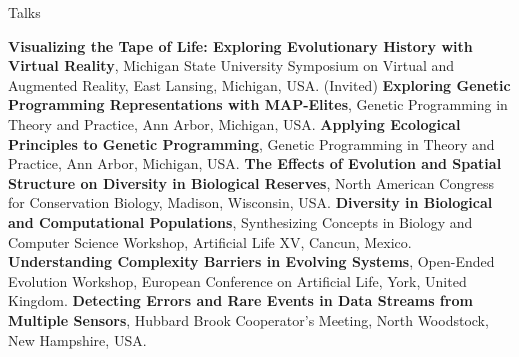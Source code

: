 \begin{rubric}{Talks}

\entry*[2018] \textbf{Visualizing the Tape of Life: Exploring Evolutionary History with Virtual Reality}, Michigan State University Symposium on Virtual and Augmented Reality, East Lansing, Michigan, USA. (Invited)
%
\entry*[2018] \textbf{Exploring Genetic Programming Representations with MAP-Elites}, Genetic Programming in Theory and Practice, Ann Arbor, Michigan, USA.
%
\entry*[2017] \textbf{Applying Ecological Principles to Genetic Programming}, Genetic Programming in Theory and Practice, Ann Arbor, Michigan, USA.
%
\entry*[2016] \textbf{The Effects of Evolution and Spatial Structure on Diversity in Biological Reserves}, North American Congress for Conservation Biology, Madison, Wisconsin, USA. 
%
\entry*[2016] \textbf{Diversity in Biological and Computational Populations}, Synthesizing Concepts in Biology and Computer Science Workshop, Artificial Life XV, Cancun, Mexico. 
%
\entry*[2015] \textbf{Understanding Complexity Barriers in Evolving Systems}, Open-Ended Evolution Workshop, European Conference on Artificial Life, York, United Kingdom. 
%
\entry*[2013] \textbf{Detecting Errors and Rare Events in Data Streams from Multiple Sensors}, Hubbard Brook Cooperator's Meeting, North Woodstock, New Hampshire, USA. 
%

\end{rubric}